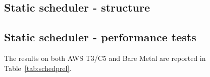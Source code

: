 \documentclass[]{scrartcl}
\begin{document}

\subsection{Static scheduler - structure}


\subsection{Static scheduler - performance tests}

The results on both AWS T3/C5 and Bare Metal are reported in Table~\ref{tab:schedprel}.
\end{document}
